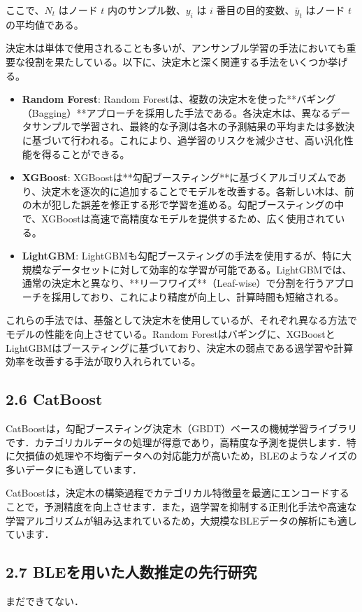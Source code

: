 ここで、$N_t$ はノード $t$ 内のサンプル数、$y_i$ は $i$ 番目の目的変数、$\bar{y}_t$ はノード $t$ の平均値である。


決定木は単体で使用されることも多いが、アンサンブル学習の手法においても重要な役割を果たしている。以下に、決定木と深く関連する手法をいくつか挙げる。

\begin{itemize}
	\item \textbf{Random Forest}: 
	Random Forestは、複数の決定木を使った**バギング（Bagging）**アプローチを採用した手法である。各決定木は、異なるデータサンプルで学習され、最終的な予測は各木の予測結果の平均または多数決に基づいて行われる。これにより、過学習のリスクを減少させ、高い汎化性能を得ることができる。
	
	\item \textbf{XGBoost}:
	XGBoostは**勾配ブースティング**に基づくアルゴリズムであり、決定木を逐次的に追加することでモデルを改善する。各新しい木は、前の木が犯した誤差を修正する形で学習を進める。勾配ブースティングの中で、XGBoostは高速で高精度なモデルを提供するため、広く使用されている。
	
	\item \textbf{LightGBM}:
	LightGBMも勾配ブースティングの手法を使用するが、特に大規模なデータセットに対して効率的な学習が可能である。LightGBMでは、通常の決定木と異なり、**リーフワイズ**（Leaf-wise）で分割を行うアプローチを採用しており、これにより精度が向上し、計算時間も短縮される。
\end{itemize}

これらの手法では、基盤として決定木を使用しているが、それぞれ異なる方法でモデルの性能を向上させている。Random Forestはバギングに、XGBoostとLightGBMはブースティングに基づいており、決定木の弱点である過学習や計算効率を改善する手法が取り入れられている。


\subsection*{2.6 CatBoost}
CatBoostは，勾配ブースティング決定木（GBDT）ベースの機械学習ライブラリです．カテゴリカルデータの処理が得意であり，高精度な予測を提供します．特に欠損値の処理や不均衡データへの対応能力が高いため，BLEのようなノイズの多いデータにも適しています．

CatBoostは，決定木の構築過程でカテゴリカル特徴量を最適にエンコードすることで，予測精度を向上させます．また，過学習を抑制する正則化手法や高速な学習アルゴリズムが組み込まれているため，大規模なBLEデータの解析にも適しています．

\subsection*{2.7 BLEを用いた人数推定の先行研究}
まだできてない．